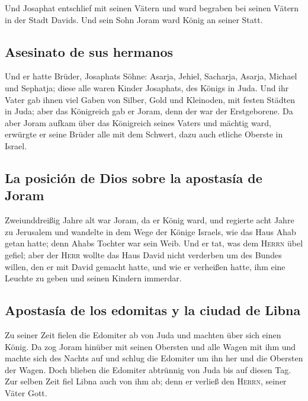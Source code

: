  Und Josaphat entschlief mit seinen Vätern und ward
begraben bei seinen Vätern in der Stadt Davids. Und sein Sohn Joram ward
König an seiner Statt.

\hypertarget{asesinato-de-sus-hermanos}{%
\subsection{Asesinato de sus hermanos}\label{asesinato-de-sus-hermanos}}

 Und er hatte Brüder, Josaphats Söhne: Asarja, Jehiel,
Sacharja, Asarja, Michael und Sephatja; diese alle waren Kinder
Josaphats, des Königs in Juda.  Und ihr Vater gab ihnen
viel Gaben von Silber, Gold und Kleinoden, mit festen Städten in Juda;
aber das Königreich gab er Joram, denn der war der Erstgeborene.
 Da aber Joram aufkam über das Königreich seines Vaters
und mächtig ward, erwürgte er seine Brüder alle mit dem Schwert, dazu
auch etliche Oberste in Israel.

\hypertarget{la-posiciuxf3n-de-dios-sobre-la-apostasuxeda-de-joram}{%
\subsection{La posición de Dios sobre la apostasía de
Joram}\label{la-posiciuxf3n-de-dios-sobre-la-apostasuxeda-de-joram}}

 Zweiunddreißig Jahre alt war Joram, da er König ward, und
regierte acht Jahre zu Jerusalem  und wandelte in dem Wege
der Könige Israels, wie das Haus Ahab getan hatte; denn Ahabs Tochter
war sein Weib. Und er tat, was dem \textsc{Herrn} übel gefiel;
 aber der \textsc{Herr} wollte das Haus David nicht
verderben um des Bundes willen, den er mit David gemacht hatte, und wie
er verheißen hatte, ihm eine Leuchte zu geben und seinen Kindern
immerdar.

\hypertarget{apostasuxeda-de-los-edomitas-y-la-ciudad-de-libna}{%
\subsection{Apostasía de los edomitas y la ciudad de
Libna}\label{apostasuxeda-de-los-edomitas-y-la-ciudad-de-libna}}

 Zu seiner Zeit fielen die Edomiter ab von Juda und
machten über sich einen König.  Da zog Joram hinüber mit
seinen Obersten und alle Wagen mit ihm und machte sich des Nachts auf
und schlug die Edomiter um ihn her und die Obersten der Wagen.
 Doch blieben die Edomiter abtrünnig von Juda bis auf
diesen Tag. Zur selben Zeit fiel Libna auch von ihm ab; denn er verließ
den \textsc{Herrn}, seiner Väter Gott.

